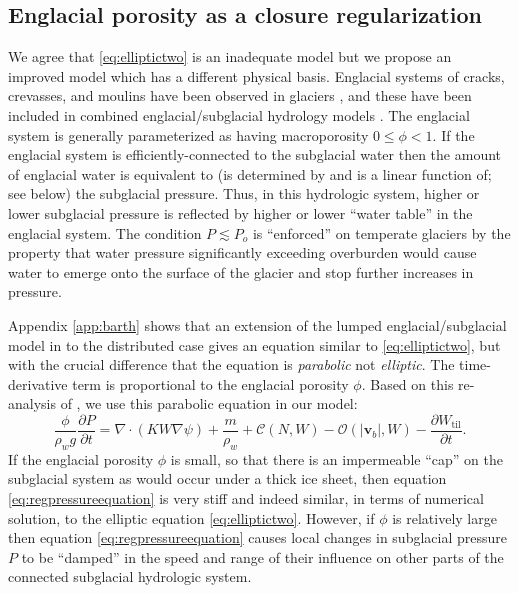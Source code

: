 \documentclass[11pt,final]{amsart}
\newcommand\bv{\mathbf{v}}
\newcommand{\ddt}[1]{\ensuremath{\frac{\partial #1}{\partial t}}}
\newcommand{\Div}{\nabla\cdot}
\newcommand{\grad}{\nabla}
\newcommand{\Wtil}{W_{\text{til}}}
\begin{document}
\subsection*{Englacial porosity as a closure regularization}  We agree that \eqref{eq:elliptictwo} is an inadequate model but we propose an improved model which has a different physical basis.  Englacial systems of cracks, crevasses, and moulins have been observed in glaciers \citep[for example]{Bartholomausetal2008,Harperetal2010}, and these have been included in combined englacial/subglacial hydrology models \citep[among others]{FlowersClarke2002_theory,Bartholomausetal2011,Hewitt2013}.  The englacial system is generally parameterized as having macroporosity $0\le \phi < 1$.  If the englacial system is efficiently-connected to the subglacial water then the amount of englacial water is equivalent to (is determined by and is a linear function of; see below) the subglacial pressure.  Thus, in this hydrologic system, higher or lower subglacial pressure is reflected by higher or lower ``water table'' in the englacial system.  The condition $P\lesssim P_o$ is ``enforced'' on temperate glaciers by the property that water pressure significantly exceeding overburden would cause water to emerge onto the surface of the glacier and stop further increases in pressure.

Appendix \ref{app:barth} shows that an extension of the lumped englacial/subglacial model in \cite{Bartholomausetal2011} to the distributed case gives an equation similar to \eqref{eq:elliptictwo}, but with the crucial difference that the equation is \emph{parabolic} not \emph{elliptic}.  The time-derivative term is proportional to the englacial porosity $\phi$.  Based on this re-analysis of \cite{Bartholomausetal2011}, we use this parabolic equation in our model:
\begin{equation}
\frac{\phi}{\rho_w g} \ddt{P} = \Div\left(K W \grad \psi\right) + \frac{m}{\rho_w} + \mathcal{C}(N,W) - \mathcal{O}(|\bv_b|,W) - \ddt{\Wtil}. \label{eq:regpressureequation}
\end{equation}
If the englacial porosity $\phi$ is small, so that there is an impermeable ``cap'' on the subglacial system as would occur under a thick ice sheet, then equation \eqref{eq:regpressureequation} is very stiff and indeed similar, in terms of numerical solution, to the elliptic equation \eqref{eq:elliptictwo}.  However, if $\phi$ is relatively large then equation \eqref{eq:regpressureequation} causes local changes in subglacial pressure $P$ to be ``damped'' in the speed and range of their influence on other parts of the connected subglacial hydrologic system.
\end{document}
